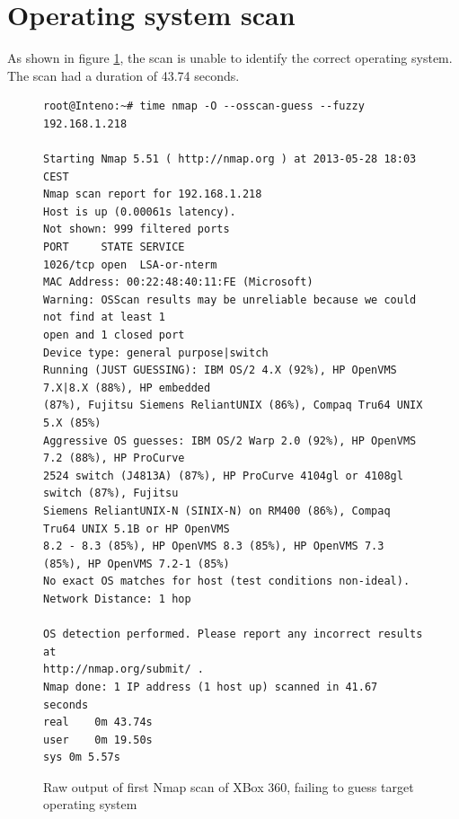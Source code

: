 \documentclass[a4paper,11pt]{kth-bcs}
\begin{document}
\newpage
\section{Operating system scan}
As shown in figure \ref{fig:nmapos}, the scan is unable to identify the correct operating system. The scan had a duration of 43.74 seconds.

   \begin{figure}[ht]
      \centering
      \begin{verbatim}
root@Inteno:~# time nmap -O --osscan-guess --fuzzy 192.168.1.218

Starting Nmap 5.51 ( http://nmap.org ) at 2013-05-28 18:03 CEST
Nmap scan report for 192.168.1.218
Host is up (0.00061s latency).
Not shown: 999 filtered ports
PORT     STATE SERVICE
1026/tcp open  LSA-or-nterm
MAC Address: 00:22:48:40:11:FE (Microsoft)
Warning: OSScan results may be unreliable because we could not find at least 1
open and 1 closed port
Device type: general purpose|switch
Running (JUST GUESSING): IBM OS/2 4.X (92%), HP OpenVMS 7.X|8.X (88%), HP embedded
(87%), Fujitsu Siemens ReliantUNIX (86%), Compaq Tru64 UNIX 5.X (85%)
Aggressive OS guesses: IBM OS/2 Warp 2.0 (92%), HP OpenVMS 7.2 (88%), HP ProCurve
2524 switch (J4813A) (87%), HP ProCurve 4104gl or 4108gl switch (87%), Fujitsu
Siemens ReliantUNIX-N (SINIX-N) on RM400 (86%), Compaq Tru64 UNIX 5.1B or HP OpenVMS
8.2 - 8.3 (85%), HP OpenVMS 8.3 (85%), HP OpenVMS 7.3 (85%), HP OpenVMS 7.2-1 (85%)
No exact OS matches for host (test conditions non-ideal).
Network Distance: 1 hop

OS detection performed. Please report any incorrect results at
http://nmap.org/submit/ .
Nmap done: 1 IP address (1 host up) scanned in 41.67 seconds
real	0m 43.74s
user	0m 19.50s
sys	0m 5.57s
      \end{verbatim}
      \caption{
         \small{
Raw output of first Nmap scan of XBox 360, failing to guess target operating system
         }
      }
      \label{fig:nmapos}
   \end{figure}

\newpage
\end{document}
